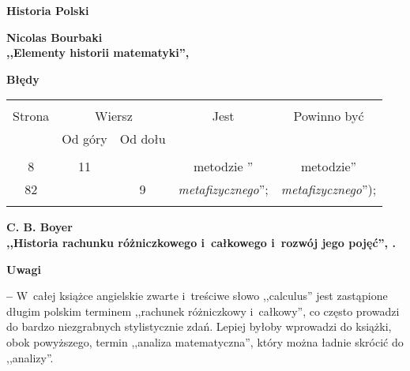 \documentclass[a4paper,11pt]{article}
\newcommand{\spaceOne}{2em}
\newcommand{\spaceTwo}{1em}
\newcommand{\spaceThree}{0.5em}
\newcommand{\tb}{\textbf}
\newcommand{\noi}{\noindent}
\newcommand{\start}{\noi \tb{--} {}}
\newcommand{\Center}[1]{\begin{center} #1 \end{center}}
\newcommand{\CenterTB}[1]{\Center{\tb{#1}}}
\newcommand{\Field}[1]{ \begin{center} {\Large \tb{#1} } \end{center} }
\newcommand{\Work}[1]{ \begin{center} {\large \tb{#1}} \end{center} }
\begin{document}
\vspace{\spaceOne}



\Field{Historia Polski}

\vspace{\spaceThree}








\Work{
  Nicolas Bourbaki \\
  ,,Elementy historii matematyki'', \cite{NBEHM} }


\CenterTB{Błędy}
\begin{center}
  \begin{tabular}{|c|c|c|c|c|}
    \hline
    & \multicolumn{2}{c|}{} & & \\
    Strona & \multicolumn{2}{c|}{Wiersz}& Jest & Powinno być \\ \cline{2-3}
    & Od góry & Od dołu &  &  \\ \hline
    & & & & \\
    8 & 11 & & metodzie '' & metodzie'' \\
    82 & & 9 & \emph{metafizycznego}''; & \emph{metafizycznego}''); \\
    & & & & \\ \hline
  \end{tabular}
\end{center}

\vspace{\spaceOne}






\Work{
  C. B. Boyer \\
  ,,Historia rachunku różniczkowego i~całkowego i~rozwój jego pojęć'',
  \cite{Boy64}. }


\CenterTB{Uwagi}

\start W~całej książce angielskie zwarte i~treściwe słowo ,,calculus''
jest zastąpione długim polskim terminem ,,rachunek różniczkowy
i~całkowy'', co często prowadzi do bardzo niezgrabnych stylistycznie
zdań. Lepiej byłoby wprowadzi do książki, obok powyższego, termin
,,analiza matematyczna'', który można ładnie skrócić do ,,analizy''.

\vspace{\spaceTwo}
\end{document}
